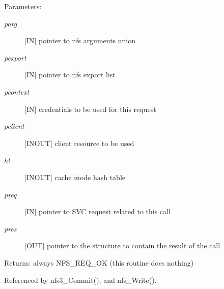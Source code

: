 \begin{Desc}
\item[Parameters:]
\begin{description}
\item[{\em parg}][IN] pointer to nfs arguments union \item[{\em pexport}][IN] pointer to nfs export list \item[{\em pcontext}][IN] credentials to be used for this request \item[{\em pclient}][INOUT] client resource to be used \item[{\em ht}][INOUT] cache inode hash table \item[{\em preq}][IN] pointer to SVC request related to this call \item[{\em pres}][OUT] pointer to the structure to contain the result of the call\end{description}
\end{Desc}
\begin{Desc}
\item[Returns:]always NFS\_\-REQ\_\-OK (this routine does nothing) \end{Desc}


Referenced by nfs3\_\-Commit(), and nfs\_\-Write().
